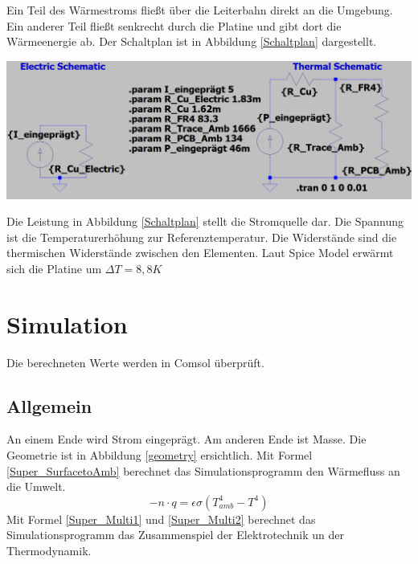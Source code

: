 \documentclass[10pt,a4paper,oneside,abstracton]{scrartcl}
\newenvironment{Figure}
  {\par\medskip\noindent\minipage{\linewidth}}
  {\endminipage\par\medskip}
\begin{document}
\begin{multicols}{2}
Ein Teil des Wärmestroms fließt über die Leiterbahn direkt an die Umgebung. 
\newline
Ein anderer Teil fließt senkrecht durch die Platine und gibt dort die Wärmeenergie ab. 
Der Schaltplan ist in Abbildung \ref*{Schaltplan} dargestellt. 
\begin{Figure}
	\includegraphics[width=\textwidth]{Bilder/Schaltplan.png}
	\label{Schaltplan}
\end{Figure}
\noindent
Die Leistung in Abbildung \ref{Schaltplan} stellt die Stromquelle dar. 
Die Spannung ist die Temperaturerhöhung zur Referenztemperatur. 
Die Widerstände sind die thermischen Widerstände zwischen den Elementen. 
\newline
Laut Spice Model erwärmt sich die Platine um $\Delta T = 8,8K$


\section{Simulation}
Die berechneten Werte werden in Comsol überprüft.
\subsection{Allgemein}
An einem Ende wird Strom eingeprägt. Am anderen Ende ist Masse.
Die Geometrie ist in Abbildung \ref*{geometry} ersichtlich.
\newline
Mit Formel \ref*{Super_SurfacetoAmb} berechnet das Simulationsprogramm den Wärmefluss an die Umwelt.
\begin{equation}
	-n \cdot q = \epsilon \sigma (T^4_{amb} - T^4)
	\label{Super_SurfacetoAmb}
	\end{equation}
	\noindent
	Mit Formel \ref*{Super_Multi1} und \ref*{Super_Multi2} berechnet das Simulationsprogramm das Zusammenspiel der Elektrotechnik un der Thermodynamik.


\end{multicols}
\end{document}
